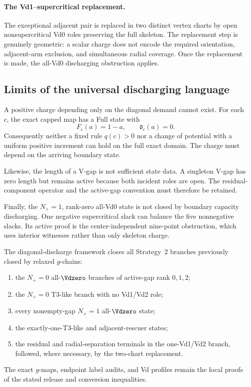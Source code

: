 \paragraph{The Vd1--supercritical replacement.}
The exceptional adjacent pair is replaced in two distinct vertex charts by
open nonsupercritical Vd0 roles preserving the full skeleton.  The replacement
step is genuinely geometric: a scalar charge does not encode the required
orientation, adjacent-arm exclusion, and simultaneous radial coverage.  Once
the replacement is made, the all-Vd0 discharging obstruction applies.

\subsection{Limits of the universal discharging language}

A positive charge depending only on the diagonal demand cannot exist.  For
each \(c\), the exact capped map has a Full state with
\[
 F_c(a)=1-a,
 \qquad
 \mathfrak d_c(a)=0.
\]
Consequently neither a fixed rule \(q(c)>0\) nor a change of potential with a
uniform positive increment can hold on the full exact domain.  The charge must
depend on the arriving boundary state.

Likewise, the length of a V-gap is not sufficient state data.  A singleton
V-gap has zero length but remains active because both incident roles are open.
The residual-component operator and the active-gap convention must therefore
be retained.

Finally, the \(N_+=1\), rank-zero all-Vd0 state is not closed by boundary
capacity discharging.  One negative supercritical slack can balance the five
nonnegative slacks.  Its active proof is the center-independent nine-point
obstruction, which uses interior witnesses rather than only skeleton charge.

\begin{proposition}
\label{prop:body-discharging-branches}
The diagonal-discharge framework closes all Strategy~2 branches previously
closed by relaxed \(g\)-chains:
\begin{enumerate}
\item the \(N_+=0\) all-\(\Vdzero\) branches of active-gap rank
      \(0,1,2\);
\item the \(N_+=0\) T3-like branch with no Vd1/Vd2 role;
\item every nonempty-gap \(N_+=1\) all-\(\Vdzero\) state;
\item the exactly-one-T3-like and adjacent-rescuer states;
\item the residual and radial-separation terminals in the one-Vd1/Vd2 branch,
      followed, where necessary, by the two-chart replacement.
\end{enumerate}
The exact \(g\)-maps, endpoint label audits, and Vd profiles remain the local
proofs of the stated release and conversion inequalities.
\end{proposition}

